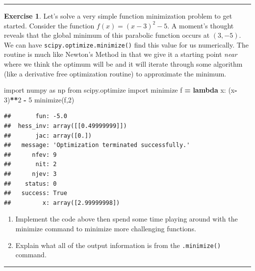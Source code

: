 \documentclass[
]{book}
\newenvironment{Shaded}{\begin{snugshade}}{\end{snugshade}}
\newcommand{\DecValTok}[1]{\textcolor[rgb]{0.00,0.00,0.81}{#1}}
\newcommand{\ImportTok}[1]{#1}
\newcommand{\KeywordTok}[1]{\textcolor[rgb]{0.13,0.29,0.53}{\textbf{#1}}}
\newcommand{\NormalTok}[1]{#1}
\newcommand{\OperatorTok}[1]{\textcolor[rgb]{0.81,0.36,0.00}{\textbf{#1}}}
\providecommand{\tightlist}{%
  \setlength{\itemsep}{0pt}\setlength{\parskip}{0pt}}
\theoremstyle{definition}
\theoremstyle{definition}
\theoremstyle{definition}
\newtheorem{exercise}{Exercise}[chapter]
\theoremstyle{remark}
\begin{document}
\begin{center}\rule{0.5\linewidth}{0.5pt}\end{center}

\begin{exercise}
\protect\hypertarget{exr:unnamed-chunk-233}{}{\label{exr:unnamed-chunk-233} }Let's solve a very simple function minimization problem to get started. Consider the function \(f(x) = (x-3)^2 - 5\). A moment's thought reveals that the global minimum of this parabolic function occurs at \((3,-5)\). We can have \texttt{scipy.optimize.minimize()} find this value for us numerically. The routine is much like Newton's Method in that we give it a starting point \emph{near} where we think the optimum will be and it will iterate through some algorithm (like a derivative free optimization routine) to approximate the minimum.
\end{exercise}

\begin{Shaded}
\begin{Highlighting}[]
\ImportTok{import}\NormalTok{ numpy }\ImportTok{as}\NormalTok{ np}
\ImportTok{from}\NormalTok{ scipy.optimize }\ImportTok{import}\NormalTok{ minimize}
\NormalTok{f }\OperatorTok{=} \KeywordTok{lambda}\NormalTok{ x: (x}\OperatorTok{{-}}\DecValTok{3}\NormalTok{)}\OperatorTok{**}\DecValTok{2} \OperatorTok{{-}} \DecValTok{5}
\NormalTok{minimize(f,}\DecValTok{2}\NormalTok{)}
\end{Highlighting}
\end{Shaded}

\begin{verbatim}
##       fun: -5.0
##  hess_inv: array([[0.49999999]])
##       jac: array([0.])
##   message: 'Optimization terminated successfully.'
##      nfev: 9
##       nit: 2
##      njev: 3
##    status: 0
##   success: True
##         x: array([2.99999998])
\end{verbatim}

\begin{enumerate}
\def\labelenumi{\alph{enumi}.}
\tightlist
\item
  Implement the code above then spend some time playing around with the minimize command to minimize more challenging functions.
\item
  Explain what all of the output information is from the \texttt{.minimize()} command.
\end{enumerate}

\begin{center}\rule{0.5\linewidth}{0.5pt}\end{center}
\end{document}
